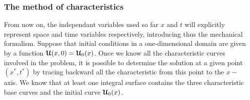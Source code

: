 \subsubsection*{The method of characteristics}
From now on, the independant variables used so far $x$ and $t$ will explicitly represent  space and time variables respectively, introducing thus the mechanical formalism. Suppose that initial conditions in a one-dimensional domain are given by a function ${\boldsymbol{\mathcal{U}}}(x,0)={\boldsymbol{\mathcal{U}}}_0(x)$. Once we know all the characteristic curves involved in the problem, it is possible to determine the solution at a given point $(x^*,t^*)$ by tracing backward all the characteristic from this point to the $x-$axis.
We know that at least one integral surface contains the three characteristic base curves and the initial curve ${\boldsymbol{\mathcal{U}}}_0(x)$.
